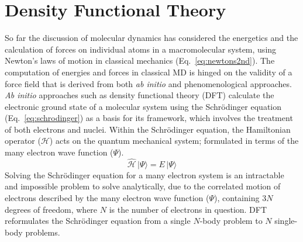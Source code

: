 %
%
\newpage
\section{Density Functional Theory} \label{chapter:onetep}
So far the discussion of molecular dynamics has considered the energetics and the calculation of forces on individual atoms in a macromolecular system, using Newton's  laws of motion in classical mechanics (Eq.~\ref{eq:newtons2nd}). The computation of energies and forces in classical MD is hinged on the validity of a force field that is derived from both \textit{ab initio} and phenomenological approaches. \textit{Ab initio} approaches such as density functional theory (DFT) calculate the electronic ground state of a molecular system using the Schr\"odinger equation (Eq.~\ref{eq:schrodinger}) as a basis for its framework, which involves the treatment of both electrons and nuclei. Within the Schr\"odinger equation, the Hamiltonian operator ($\mathcal{H}$) acts on the quantum mechanical system; formulated in terms of the many electron wave function ($\Psi$).\cite{Schrodinger1926undulatory}
%
\begin{equation} \label{eq:schrodinger}
    \mathcal{\hat{H}}\, | \Psi \rangle = E \, | \Psi \rangle
\end{equation}
%
Solving the Schr\"odinger equation for a many electron system is an intractable and impossible problem to solve analytically, due to the correlated motion of electrons described by the many electron wave function ($\Psi$), containing $3N$ degrees of freedom, where $N$ is the number of electrons in question. DFT reformulates the Schr\"odinger equation from a single $N$-body problem to $N$ single-body problems.

